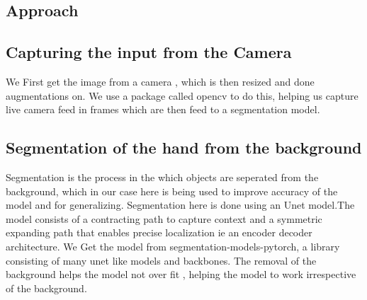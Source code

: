 \documentclass[14pt]{extarticle}
\begin{document}
\begin{multicols}{2}
        \section{Approach} \label{sec:approach}

        \subsection{Capturing the input from the Camera}\label{subsec:Camera}
        We First get the image from a camera , which is then resized and done augmentations on.
        We use a package called opencv to do this, helping us capture live camera feed in frames which are then feed to
        a segmentation model.
        \begin{figure}[H]
            \begin{subfigure}[b]{0.5\textwidth}
                \centering
                \label{fig:1}

                \label{fig:Figure 1}
            \end{subfigure}

        \end{figure}

        \subsection{Segmentation of the hand from the background}\label{subsec:Segmentation}
        Segmentation is the process in the which objects are seperated from the background, which in our case here is
        being used to improve accuracy of the model and for generalizing.
        Segmentation here is done using an Unet model.The model consists of a contracting path to capture
        context and a symmetric expanding path that enables precise localization ie an encoder decoder architecture.
        We Get the model from segmentation-models-pytorch, a library consisting of many unet like models and backbones.
        The removal of the background helps the model not over fit , helping the model to work irrespective of the
        background.





        \begin{figure}[H]
            \begin{subfigure}[b]{0.5\textwidth}
                \centering
                \label{fig:2}
                \label{fig:3}


\end{subfigure}
\end{figure}
\end{multicols}
\end{document}
